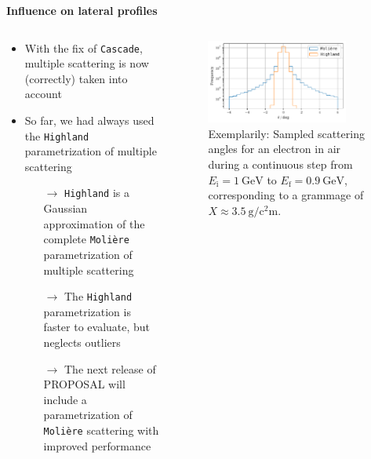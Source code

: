 \documentclass[aspectratio=1610, 9pt]{beamer}
\begin{document}
\begin{frame}
  \textbf{Influence on lateral profiles}
  \vspace{5mm}

      \begin{columns}[onlytextwidth]
        \begin{column}{0.45\textwidth}
            \begin{itemize}
              \item With the fix of \texttt{Cascade}, multiple scattering is now (correctly) taken into account
              \item So far, we had always used the \texttt{Highland} parametrization of multiple scattering
              \begin{itemize}
                \item[$\rightarrow$] \texttt{Highland} is a Gaussian approximation of the complete \texttt{Molière} parametrization of multiple scattering
                \item[$\rightarrow$] The \texttt{Highland} parametrization is faster to evaluate, but neglects outliers
                \item[$\rightarrow$] The next release of PROPOSAL will include a parametrization of \texttt{Molière} scattering with improved performance
              \end{itemize}
            \end{itemize}
        \end{column}
        \begin{column}{0.55\textwidth}
            \begin{figure}
                \centering
                \includegraphics[width=0.85\textwidth]{plots/scattering_comparison.pdf}
                \caption{Exemplarily: Sampled scattering angles for an electron in air during a continuous step from $E_\text{i} = \SI{1}{\giga\electronvolt}$ to $E_\text{f} = \SI{0.9}{\giga\electronvolt}$, corresponding to a grammage of $X \approx \SI{3.5}{\gram\per\square\centi\meter}$.}
            \end{figure}
        \end{column}
    \end{columns}

\end{frame}
\end{document}
